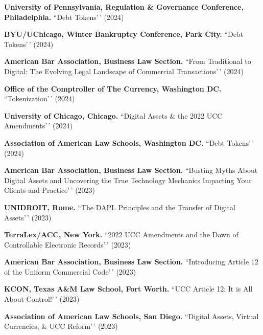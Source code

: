 \documentclass[
  11pt,
  letterpaper]{article}
\begin{document}
\vspace{0.8em}\noindent\textbf{University of Pennsylvania, Regulation \& Governance Conference, Philadelphia.}
``Debt Tokens'\,' (2024)

\vspace{0.8em}\noindent\textbf{BYU/UChicago, Winter Bankruptcy Conference, Park City.}
``Debt Tokens'\,' (2024)

\vspace{0.8em}\noindent\textbf{American Bar Association, Business Law Section.}
``From Traditional to Digital: The Evolving Legal Landscape of
Commercial Transactions'\,' (2024)

\vspace{0.8em}\noindent\textbf{Office of the Comptroller of The Currency, Washington DC.}
``Tokenization'\,' (2024)

\vspace{0.8em}\noindent\textbf{University of Chicago, Chicago.}
``Digital Assets \& the 2022 UCC Amendments'\,' (2024)

\vspace{0.8em}\noindent\textbf{Association of American Law Schools, Washington DC.}
``Debt Tokens'\,' (2024)

\vspace{0.8em}\noindent\textbf{American Bar Association, Business Law Section.}
``Busting Myths About Digital Assets and Uncovering the True Technology
Mechanics Impacting Your Clients and Practice'\,' (2023)

\vspace{0.8em}\noindent\textbf{UNIDROIT, Rome.} ``The DAPL Principles
and the Transfer of Digital Assets'\,' (2023)

\vspace{0.8em}\noindent\textbf{TerraLex/ACC, New York.} ``2022 UCC
Amendments and the Dawn of Controllable Electronic Records'\,' (2023)

\vspace{0.8em}\noindent\textbf{American Bar Association, Business Law Section.}
``Introducing Article 12 of the Uniform Commercial Code'\,' (2023)

\vspace{0.8em}\noindent\textbf{KCON, Texas A\&M Law School, Fort Worth.}
``UCC Article 12: It is All About Control!'\,' (2023)

\vspace{0.8em}\noindent\textbf{Association of American Law Schools, San Diego.}
``Digital Assets, Virtual Currencies, \& UCC Reform'\,' (2023)
\end{document}
